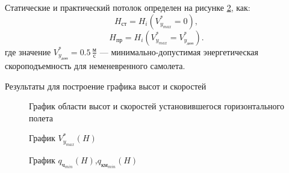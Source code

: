 Статические и практический потолок определен на рисунке \ref{fig:H_v_celling},
как:
\[
    H_{ст} = H_i(V_{y_{max}}^*=0),
\]
\[
    H_{пр} = H_i(V_{y_{max}}^*=V_{y_{доп}}^*).
\]
где значение $V_{y_{доп}}^* = 0.5 \, \frac{м}{с}$ --- минимально-допустимая 
энергетическая скороподъемность для неменевренного самолета.

\begin{sidewaystable}
    \centering
    \caption{Результаты для построение графика высот и скоростей}
    \label{tab:H_M}
    \resizebox{\textwidth}{!}{
    
}
\end{sidewaystable}
\newpage

\begin{figure}[H]
\centering

\caption{График области высот и скоростей установившегося горизонтального полета}
\label{fig:H_M}
\end{figure}

\begin{figure}[H]
    \centering
    \resizebox{.79\linewidth}{!}{}
    \caption{График $V_{y_{max}}^*(H)$}
    \label{fig:H_v_celling}
\end{figure}

\begin{figure}[H]
    \centering
    \resizebox{.79\linewidth}{!}{}
    \caption{График $q_{ч_{min}}(H)$,$q_{км_{min}}(H)$}
    \label{fig:q_min_H}
\end{figure}

